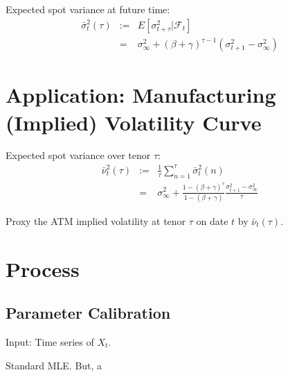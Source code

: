 \documentclass[10pt,a4paper]{article}
\newcommand{\filterationF}{\mathcal{F}}
\begin{document}
Expected spot variance at future time: 
\begin{eqnarray}
\bar\sigma^2_{t}(\tau) & :=& E\left[\sigma_{t+\tau}^2 | \filterationF_t\right] \nonumber\\
& = & \sigma_\infty^2 + (\beta + \gamma)^{\tau-1}(\sigma_{t+1}^2 - \sigma_{\infty}^2)
\label{eqn:future-spot-vol}
\end{eqnarray}

\section{Application: Manufacturing (Implied) Volatility Curve}

Expected spot variance over tenor $\tau$: 
\begin{eqnarray}
\bar\nu^2_{t}(\tau) & := & \frac{1}{\tau} \sum_{n=1}^{\tau} \bar\sigma^2_{t}(n) \nonumber\\
& = & \sigma_{\infty}^2 + \frac{1-(\beta+\gamma)^\tau}{1-(\beta+\gamma)} \frac{\sigma^2_{t+1}-\sigma^2_{\infty}}{\tau}
\label{eqn:future-spot-vol}
\end{eqnarray}

Proxy the ATM implied volatility at tenor $\tau$ on date $t$ by $\bar\nu_t(\tau)$. 

\section{Process}

\subsection{Parameter Calibration}

Input: Time series of $X_t$. 

Standard MLE. But, a 

	
\end{document}
